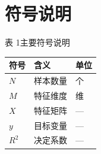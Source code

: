 \section{符号说明}

\newpage
\begin{center}
  {\fontsize{12pt}{14.4pt}\heiti 表 1\quad 主要符号说明}\\[0.6em]
  \resulttablestart
  \begin{tabularx}{0.74\textwidth}{@{}>{\centering\arraybackslash}p{}>{\raggedright\arraybackslash}X>{\centering\arraybackslash}p{}@{}}
    \toprule
    \textbf{符号} & \textbf{含义} & \textbf{单位} \\
    \midrule
    $N$   & 样本数量 & 个 \\
    $M$   & 特征维度 & 维 \\
    $X$   & 特征矩阵 & --- \\
    $y$   & 目标变量 & --- \\
    $R^2$ & 决定系数 & --- \\
    \bottomrule
  \end{tabularx}
\end{center}
